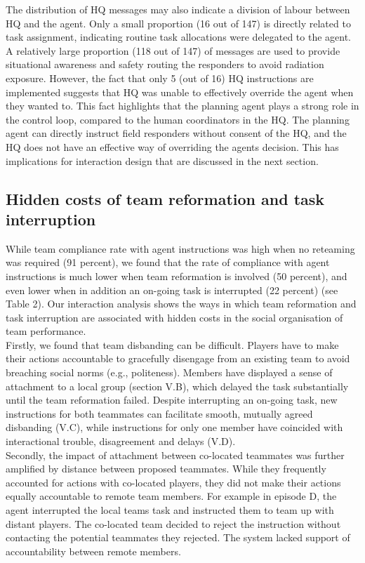 The distribution of HQ messages may also indicate a division of labour between HQ and the agent. Only a small proportion (16 out of 147) is directly related to task assignment, indicating routine task allocations were delegated to the agent. A relatively large proportion (118 out of 147) of messages are used to provide situational awareness and safety routing the responders to avoid radiation exposure. However, the fact that only 5 (out of 16) HQ instructions are implemented suggests that HQ was unable to effectively override the agent when they wanted to. This fact highlights that the planning agent plays a strong role in the control loop, compared to the human coordinators in the HQ. The planning agent can directly instruct field responders without consent of the HQ, and the HQ does not have an effective way of overriding the agents decision. This has implications for interaction design that are discussed in the next section. 

\subsection{Hidden costs of team reformation and task interruption}
While team compliance rate with agent instructions was high when no reteaming was required (91 percent), we found that the rate of compliance with agent instructions is much lower when team reformation is involved (50 percent), and even lower when in addition an on-going task is interrupted (22 percent) (see Table 2). Our interaction analysis shows the ways in which team reformation and task interruption are associated with hidden costs in the social organisation of team performance.  \\

Firstly, we found that team disbanding can be difficult. Players have to make their actions accountable to gracefully disengage from an existing team to avoid breaching social norms (e.g., politeness). Members have displayed a sense of attachment to a local group (section V.B), which delayed the task substantially until the team reformation failed. Despite interrupting an on-going task, new instructions for both teammates can facilitate smooth, mutually agreed disbanding (V.C), while instructions for only one member have coincided with interactional trouble, disagreement and delays (V.D). \\

Secondly, the impact of attachment between co-located teammates was further amplified by distance between proposed teammates. While they frequently accounted for actions with co-located players, they did not make their actions equally accountable to remote team members. For example in episode D, the agent interrupted the local teams task and instructed them to team up with distant players. The co-located team decided to reject the instruction without contacting the potential teammates they rejected. The system lacked support of accountability between remote members. \\

